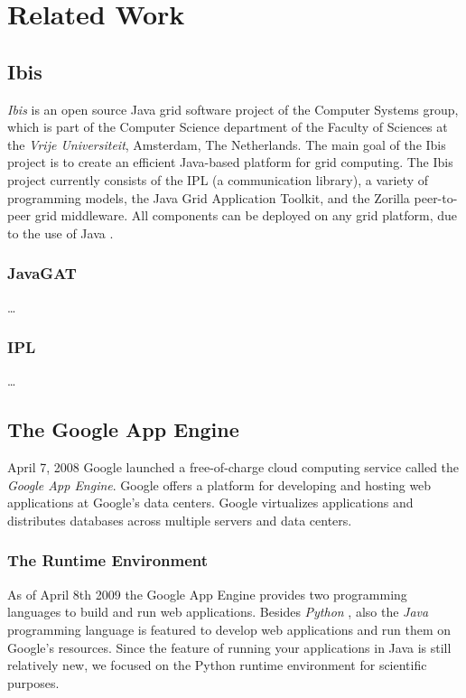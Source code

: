 \section{Related Work}
\label{related}

\subsection{Ibis}
\label{related-ibis}
\emph{Ibis} is an open source Java grid software project of the Computer Systems
group, which is part of the Computer Science department of the Faculty of
Sciences at the \emph{Vrije Universiteit}, Amsterdam, The Netherlands. The main
goal of the Ibis project is to create an efficient Java-based platform for grid
computing. The Ibis project currently consists of the IPL (a communication
library), a variety of programming models, the Java Grid Application Toolkit, and
the Zorilla peer-to-peer grid middleware. All components can be deployed on any
grid platform, due to the use of Java \cite{ibis-www}.

\subsubsection{JavaGAT}
\ldots

\subsubsection{IPL}
\ldots

\subsection{The Google App Engine}
\label{related-appengine}
April 7, 2008 Google launched a free-of-charge cloud computing service called
the \emph{Google App Engine}. Google offers a platform for developing and
hosting web applications at Google's data centers. Google virtualizes
applications and distributes databases across multiple servers and data centers.

\subsubsection{The Runtime Environment}
As of April 8th 2009 \cite{app-engine-java} the Google App Engine provides two
programming languages to build and run web applications. Besides \emph{Python}
\cite{python-www}, also the \emph{Java} \cite{java-www} programming language is
featured to develop web applications and run them on Google's resources. Since
the feature of running your applications in Java is still relatively new, we
focused on the Python runtime environment for scientific purposes.

